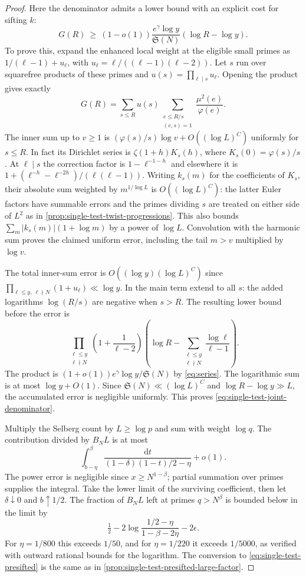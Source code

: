 \documentclass[11pt,a4paper]{article}
\numberwithin{equation}{section}
\newcommand{\SSS}{\mathfrak S}
\newcommand{\ud}{\mathrm d}
\begin{document}
\begin{proof}
Here the denominator admits a lower bound with an explicit
cost for sifting $k$:
\begin{equation}
 G(R)\ \ge\ (1-o(1))\frac{e^\gamma\log y}{\SSS(N)}
                         (\log R-\log y).
 \label{eq:single-test-joint-denominator}
\end{equation}
To prove this, expand the enhanced local weight at the eligible
small primes as $1/(\ell-1)+u_\ell$, with
$u_\ell=\ell/((\ell-1)(\ell-2))$. Let $s$ run over squarefree
products of these primes and $u(s)=\prod_{\ell\mid s}u_\ell$.
Opening the product gives exactly
\[
 G(R)=\sum_{s\le R}u(s)
       \sum_{\substack{e\le R/s\\(e,s)=1}}\frac{\mu^2(e)}{\varphi(e)} .
\]
The inner sum up to $v\ge1$ is
$(\varphi(s)/s)\log v+O((\log L)^C)$ uniformly for $s\le R$.
In fact its Dirichlet series is $\zeta(1+h)K_s(h)$, where
$K_s(0)=\varphi(s)/s$. At $\ell\mid s$ the correction factor is
$1-\ell^{-1-h}$ and elsewhere it is
$1+(\ell^{-h}-\ell^{-2h})/(\ell(\ell-1))$.
Writing $k_s(m)$ for the coefficients of $K_s$, their absolute
sum weighted by $m^{1/\log L}$ is $O((\log L)^C)$: the latter
Euler factors have summable errors and the primes dividing $s$
are treated on either side of $L^2$ as in
\cref{prop:single-test-twist-progressions}. This also bounds
$\sum_m|k_s(m)|(1+\log m)$ by a power of $\log L$. Convolution
with the harmonic sum proves the claimed uniform error, including
the tail $m>v$ multiplied by $\log v$.

The total inner-sum error is $O((\log y)(\log L)^C)$ since
$\prod_{\ell\le y,\ \ell\nmid N}(1+u_\ell)\ll\log y$.
In the main term extend to all $s$: the added logarithms
$\log(R/s)$ are negative when $s>R$. The resulting lower
bound before the error is
\[
 \prod_{\substack{\ell\le y\\\ell\nmid N}}\left(1+\frac1{\ell-2}\right)
 \left(\log R-\sum_{\substack{\ell\le y\\\ell\nmid N}}
                          \frac{\log\ell}{\ell-1}\right).
\]
The product is $(1+o(1))e^\gamma\log y/\SSS(N)$ by
\eqref{eq:series}. The logarithmic sum is at most $\log y+O(1)$.
Since $\SSS(N)\ll(\log L)^C$ and $\log R-\log y\gg L$,
the accumulated error is negligible uniformly. This proves
\eqref{eq:single-test-joint-denominator}.

Multiply the Selberg count by $L\ge\log p$ and sum with
weight $\log q$. The contribution divided by $B_NL$ is at most
\[
 \int_{b-\eta}^{\beta}
 \frac{\ud t}{(1-\delta)(1-t)/2-\eta}+o(1).
\]
The power error is negligible since $x\ge N^{1-\beta}$;
partial summation over primes supplies the integral. Take the
lower limit of the surviving coefficient, then let
$\delta\downarrow0$ and $b\uparrow1/2$. The fraction of $B_NL$
left at primes $q>N^\beta$ is bounded below in the limit by
\[
 \tfrac12-2\log\frac{1/2-\eta}{1-\beta-2\eta}-2\epsilon .
\]
For $\eta=1/800$ this exceeds $1/50$, and for $\eta=1/220$
it exceeds $1/5000$, as verified with outward rational bounds
for the logarithm. The conversion to \eqref{eq:single-test-presifted}
is the same as in \cref{prop:single-test-presifted-large-factor}.
\end{proof}
\end{document}
